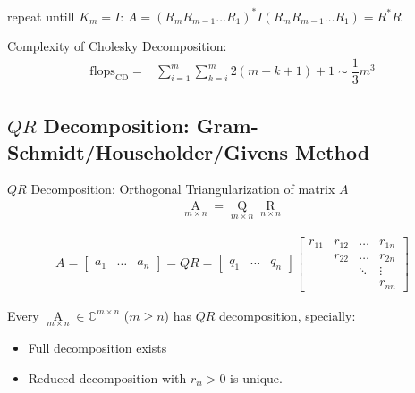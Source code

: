     repeat untill $ K_m=I $: $ A=(R_mR_{m-1}\ldots R_1)^*I(R_mR_{m-1}\ldots R_1)=R^*R $
    
    Complexity of Cholesky Decomposition:
    \begin{align}
        \mathrm{flops}_\mathrm{CD}=&\sum_{i=1}^{m}\sum_{k=i}^m 2(m-k+1)+1 \sim \dfrac{1}{3}m^3
    \end{align}
 
    
    









    



\subsection{$ QR $ Decomposition: Gram-Schmidt/Householder/Givens Method}\label{SubSubSectionQRDecomposition}
    
    $ QR $ Decomposition: Orthogonal Triangularization of matrix $ A $
\begin{align}
    \mathop{A}\limits_{m\times n} =\mathop{Q}\limits_{m\times n} \mathop{R}\limits_{n\times n}     
\end{align}


\begin{align}
    A=\begin{bmatrix}
        a_1&\ldots &a_n
    \end{bmatrix} 
    =QR=
    \begin{bmatrix}
        q_1&\ldots&q_n
    \end{bmatrix}
    \begin{bmatrix}
        r_{11}&r_{12}&\ldots&r_{1n}\\
        &r_{22}&\ldots&r_{2n}\\
        &&\ddots&\vdots\\
        &&&r_{nn}
    \end{bmatrix}
\end{align}

    Every $ \mathop{A}\limits_{m\times n} \in \mathbb{C}^{m\times n} $ ($ m\geq n $) has $ QR $ decomposition, specially:
    \begin{itemize}[topsep=2pt,itemsep=0pt]
        \item Full decomposition exists
        \item Reduced decomposition with $ r_{ii}>0 $ is unique.
    \end{itemize}
    
